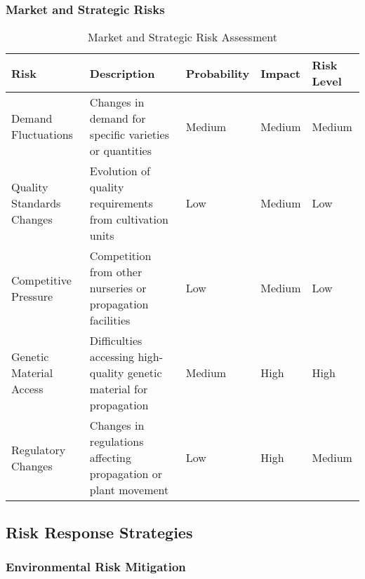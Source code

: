 \subsubsection{Market and Strategic Risks}

\begin{table}[h]
\centering
\begin{tabular}{|p{4cm}|p{4cm}|p{2cm}|p{2cm}|p{3cm}|}
\hline
\textbf{Risk} & \textbf{Description} & \textbf{Probability} & \textbf{Impact} & \textbf{Risk Level} \\
\hline
Demand Fluctuations & Changes in demand for specific varieties or quantities & Medium & Medium & Medium \\
\hline
Quality Standards Changes & Evolution of quality requirements from cultivation units & Low & Medium & Low \\
\hline
Competitive Pressure & Competition from other nurseries or propagation facilities & Low & Medium & Low \\
\hline
Genetic Material Access & Difficulties accessing high-quality genetic material for propagation & Medium & High & High \\
\hline
Regulatory Changes & Changes in regulations affecting propagation or plant movement & Low & High & Medium \\
\hline
\end{tabular}
\caption{Market and Strategic Risk Assessment}
\end{table}

\subsection{Risk Response Strategies}

\subsubsection{Environmental Risk Mitigation}

